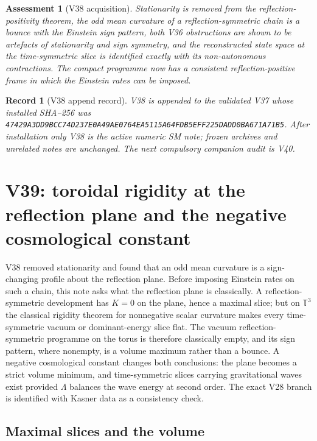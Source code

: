 \documentclass[11pt]{article}
\newtheorem{assessment}[theorem]{Assessment}
\newtheorem{record}[theorem]{Record}
\theoremstyle{remark}
\begin{document}
\begin{assessment}[V38 acquisition]
\label{ass:v19v38}
Stationarity is removed from the reflection-positivity theorem, the odd
mean curvature of a reflection-symmetric chain is a bounce with the
Einstein sign pattern, both V36 obstructions are shown to be artefacts
of stationarity and sign symmetry, and the reconstructed state space at
the time-symmetric slice is identified exactly with its non-autonomous
contractions.  The compact programme now has a consistent
reflection-positive frame in which the Einstein rates can be imposed.
\end{assessment}

\begin{record}[V38 append record]
\label{rec:v19v38}
V38 is appended to the validated V37 whose installed SHA--256 was
\texttt{47429A3DD9BCC74D237E0A49AE0764EA5115A64FDB5EFF225DADD0BA671A71B5}.
After installation only V38 is the active numeric SM note; frozen
archives and unrelated notes are unchanged.  The next compulsory
companion audit is V40.
\end{record}


\section{V39: toroidal rigidity at the reflection plane and the negative cosmological constant}
\label{sec:v19v39}

V38 removed stationarity and found that an odd mean curvature is a
sign-changing profile about the reflection plane.  Before imposing
Einstein rates on such a chain, this note asks what the reflection plane
is classically.  A reflection-symmetric development has \(K=0\) on the
plane, hence a maximal slice; but on \(\mathbb T^3\) the classical
rigidity theorem for nonnegative scalar curvature makes every
time-symmetric vacuum or dominant-energy slice flat.  The vacuum
reflection-symmetric programme on the torus is therefore classically
empty, and its sign pattern, where nonempty, is a volume maximum rather
than a bounce.  A negative cosmological constant changes both
conclusions: the plane becomes a strict volume minimum, and
time-symmetric slices carrying gravitational waves exist provided
\(\Lambda\) balances the wave energy at second order.  The exact V28
branch is identified with Kasner data as a consistency check.

\subsection{Maximal slices and the volume}
\end{document}
